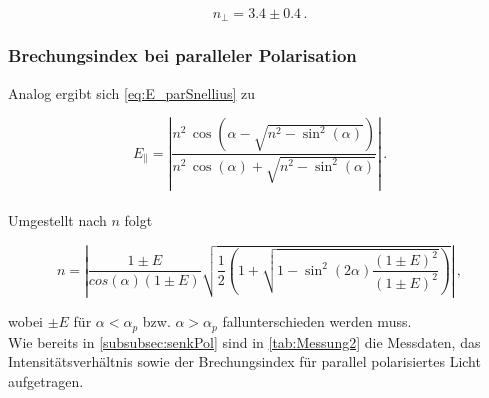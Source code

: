   \begin{equation*}
      n_\perp = 3.4 \pm 0.4 \,. 
  \end{equation*}

\subsubsection{Brechungsindex bei paralleler Polarisation}

Analog ergibt sich \eqref{eq:E_parSnellius} zu

\begin{equation*}
    E_\parallel = \left| \frac{n^2 \, \cos(\alpha - \sqrt{n^2 - \sin^2(\alpha)})}{n^2 \, \cos(\alpha) + \sqrt{n^2 - \sin^2(\alpha)}} \right| \,.
\end{equation*} \\

Umgestellt nach $n$ folgt

\begin{equation*}
    n  = \left| \frac{1 \pm E}{cos(\alpha) (1 \pm E)} \sqrt{\frac{1}{2} 
    \left(1 + \sqrt{1 - \sin^2(2 \alpha) \frac{(1 \pm E)^2}{(1 \pm E)^2}} \right)} \right| \,,
\end{equation*}

wobei $\pm E$ für $\alpha < \alpha_p$ bzw. $\alpha > \alpha_p$ fallunterschieden werden muss. \\

Wie bereits in \autoref{subsubsec:senkPol} sind in \autoref{tab:Messung2} die Messdaten, das Intensitätsverhältnis sowie der Brechungsindex für parallel polarisiertes Licht aufgetragen.

